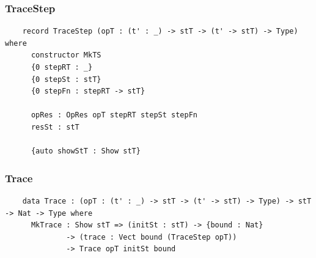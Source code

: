 \documentclass[compress,handout]{beamer}
\begin{document}
\begin{frame}[fragile]
  \frametitle{TraceStep}

  \begin{verbatim}
    record TraceStep (opT : (t' : _) -> stT -> (t' -> stT) -> Type) where
      constructor MkTS
      {0 stepRT : _}
      {0 stepSt : stT}
      {0 stepFn : stepRT -> stT}

      opRes : OpRes opT stepRT stepSt stepFn
      resSt : stT

      {auto showStT : Show stT}
  \end{verbatim}

\end{frame}


\begin{frame}[fragile]
  \frametitle{Trace}

  \begin{verbatim}
    data Trace : (opT : (t' : _) -> stT -> (t' -> stT) -> Type) -> stT -> Nat -> Type where
      MkTrace : Show stT => (initSt : stT) -> {bound : Nat}
              -> (trace : Vect bound (TraceStep opT))
              -> Trace opT initSt bound
  \end{verbatim}

\end{frame}
\end{document}
